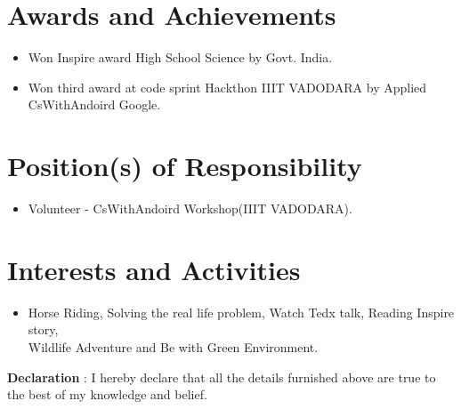 \documentclass{article}
\begin{document}

\section{Awards and Achievements}
\begin{itemize}
\item Won Inspire award High School Science by Govt. India.
\item Won third award at code sprint Hackthon IIIT VADODARA by Applied CsWithAndoird Google.
 
\end{itemize}


\section{Position(s) of Responsibility}

\begin{itemize}
\item Volunteer - CsWithAndoird Workshop(IIIT VADODARA). 
\end{itemize}



\section{Interests and Activities}
\begin{itemize}
\item[] Horse Riding, Solving the real life problem,  Watch Tedx talk, Reading Inspire story, \\Wildlife Adventure and Be with Green Environment.\end{itemize}

\textbf{Declaration} : I hereby declare that all the details furnished above are true to the best of my knowledge and belief.
\end{document}
